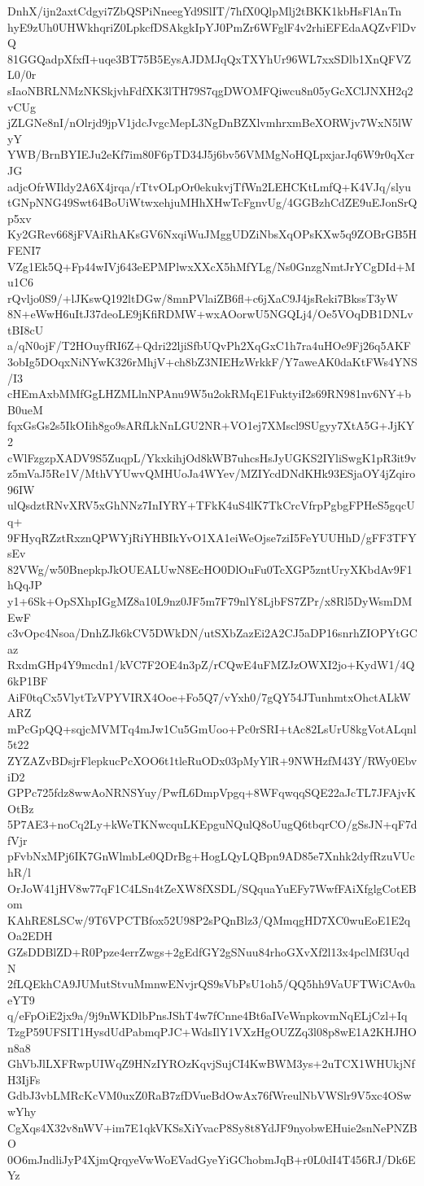 DnhX/ijn2axtCdgyi7ZbQSPiNneegYd9SlIT/7hfX0QlpMlj2tBKK1kbHsFlAnTn
hyE9zUh0UHWkhqriZ0LpkcfDSAkgkIpYJ0PmZr6WFglF4v2rhiEFEdaAQZvFlDvQ
81GGQadpXfxfI+uqe3BT75B5EysAJDMJqQxTXYhUr96WL7xxSDlb1XnQFVZL0/0r
sIaoNBRLNMzNKSkjvhFdfXK3lTH79S7qgDWOMFQiwcu8n05yGcXClJNXH2q2vCUg
jZLGNe8nI/nOlrjd9jpV1jdcJvgcMepL3NgDnBZXlvmhrxmBeXORWjv7WxN5lWyY
YWB/BrnBYIEJu2eKf7im80F6pTD34J5j6bv56VMMgNoHQLpxjarJq6W9r0qXcrJG
adjcOfrWIldy2A6X4jrqa/rTtvOLpOr0ekukvjTfWn2LEHCKtLmfQ+K4VJq/slyu
tGNpNNG49Swt64BoUiWtwxehjuMHhXHwTcFgnvUg/4GGBzhCdZE9uEJonSrQp5xv
Ky2GRev668jFVAiRhAKsGV6NxqiWuJMggUDZiNbsXqOPsKXw5q9ZOBrGB5HFENI7
VZg1Ek5Q+Fp44wIVj643eEPMPlwxXXcX5hMfYLg/Ns0GnzgNmtJrYCgDId+Mu1C6
rQvljo0S9/+lJKswQ192ltDGw/8mnPVlaiZB6fl+c6jXaC9J4jsReki7BkssT3yW
8N+eWwH6uItJ37deoLE9jKfiRDMW+wxAOorwU5NGQLj4/Oe5VOqDB1DNLvtBI8cU
a/qN0ojF/T2HOuyfRI6Z+Qdri22ljiSfbUQvPh2XqGxC1h7ra4uHOe9Fj26q5AKF
3obIg5DOqxNiNYwK326rMhjV+ch8bZ3NIEHzWrkkF/Y7aweAK0daKtFWs4YNS/I3
cHEmAxbMMfGgLHZMLlnNPAnu9W5u2okRMqE1FuktyiI2s69RN981nv6NY+bB0ueM
fqxGsGs2s5IkOIih8go9sARfLkNnLGU2NR+VO1ej7XMscl9SUgyy7XtA5G+JjKY2
cWlFzgzpXADV9S5ZuqpL/YkxkihjOd8kWB7uhcsHsJyUGKS2IYliSwgK1pR3it9v
z5mVaJ5Re1V/MthVYUwvQMHUoJa4WYev/MZIYcdDNdKHk93ESjaOY4jZqiro96IW
ulQsdztRNvXRV5xGhNNz7InIYRY+TFkK4uS4lK7TkCrcVfrpPgbgFPHeS5gqcUq+
9FHyqRZztRxznQPWYjRiYHBIkYvO1XA1eiWeOjse7ziI5FeYUUHhD/gFF3TFYsEv
82VWg/w50BnepkpJkOUEALUwN8EcHO0DlOuFu0TcXGP5zntUryXKbdAv9F1hQqJP
y1+6Sk+OpSXhpIGgMZ8a10L9nz0JF5m7F79nlY8LjbFS7ZPr/x8Rl5DyWsmDMEwF
c3vOpc4Nsoa/DnhZJk6kCV5DWkDN/utSXbZazEi2A2CJ5aDP16snrhZIOPYtGCaz
RxdmGHp4Y9mcdn1/kVC7F2OE4n3pZ/rCQwE4uFMZJzOWXI2jo+KydW1/4Q6kP1BF
AiF0tqCx5VlytTzVPYVIRX4Ooe+Fo5Q7/vYxh0/7gQY54JTunhmtxOhctALkWARZ
mPcGpQQ+sqjcMVMTq4mJw1Cu5GmUoo+Pc0rSRI+tAc82LsUrU8kgVotALqnl5t22
ZYZAZvBDsjrFlepkucPcXOO6t1tleRuODx03pMyYlR+9NWHzfM43Y/RWy0EbviD2
GPPc725fdz8wwAoNRNSYuy/PwfL6DmpVpgq+8WFqwqqSQE22aJcTL7JFAjvKOtBz
5P7AE3+noCq2Ly+kWeTKNwcquLKEpguNQulQ8oUugQ6tbqrCO/gSsJN+qF7dfVjr
pFvbNxMPj6IK7GnWlmbLe0QDrBg+HogLQyLQBpn9AD85e7Xnhk2dyfRzuVUchR/l
OrJoW41jHV8w77qF1C4LSn4tZeXW8fXSDL/SQquaYuEFy7WwfFAiXfglgCotEBom
KAhRE8LSCw/9T6VPCTBfox52U98P2sPQnBlz3/QMmqgHD7XC0wuEoE1E2qOa2EDH
GZsDDBlZD+R0Ppze4errZwgs+2gEdfGY2gSNuu84rhoGXvXf2l13x4pclMf3UqdN
2fLQEkhCA9JUMutStvuMmnwENvjrQS9sVbPsU1oh5/QQ5hh9VaUFTWiCAv0aeYT9
q/eFpOiE2jx9a/9j9nWKDlbPnsJShT4w7fCnne4Bt6aIVeWnpkovmNqELjCzl+Iq
TzgP59UFSIT1HysdUdPabmqPJC+WdsIlY1VXzHgOUZZq3l08p8wE1A2KHJHOn8a8
GhVbJlLXFRwpUIWqZ9HNzIYROzKqvjSujCI4KwBWM3ys+2uTCX1WHUkjNfH3IjFs
GdbJ3vbLMRcKcVM0uxZ0RaB7zfDVueBdOwAx76fWreulNbVWSlr9V5xc4OSwwYhy
CgXqs4X32v8nWV+im7E1qkVKSsXiYvacP8Sy8t8YdJF9nyobwEHuie2snNePNZBO
0O6mJndliJyP4XjmQrqyeVwWoEVadGyeYiGChobmJqB+r0L0dI4T456RJ/Dk6EYz
